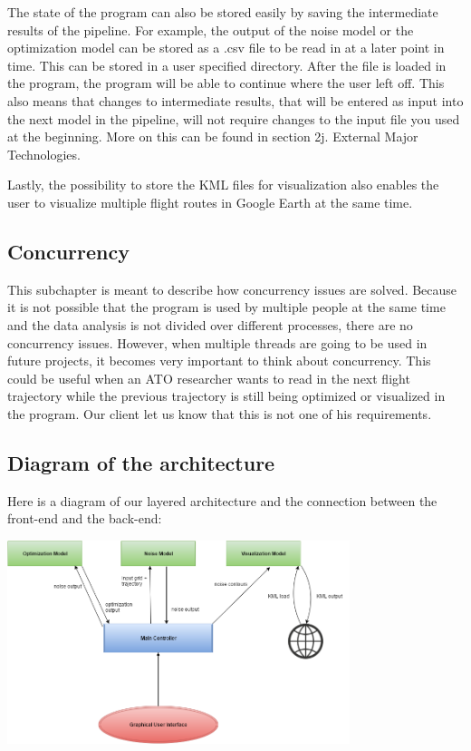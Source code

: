 The state of the program can also be stored easily by saving the intermediate results of the pipeline. For example, the output of the noise model or the optimization model can be stored as a .csv file to be read in at a later point in time. This can be stored in a user specified directory. After the file is loaded in the program, the program will be able to continue where the user left off. This also means that changes to intermediate results, that will be entered as input into the next model in the pipeline, will not require changes to the input file you used at the beginning. More on this can be found in section 2j. External Major Technologies.
 
Lastly, the possibility to store the KML files for visualization also enables the user to visualize multiple flight routes in Google Earth at the same time.

\subsection{Concurrency}
This subchapter is meant to describe how concurrency issues are solved. Because it is not possible that the program is used by multiple people at the same time and the data analysis is not divided over different processes, there are no concurrency issues. However, when multiple threads are going to be used in future projects, it becomes very important to think about concurrency. This could be useful when an ATO researcher wants to read in the next flight trajectory while the previous trajectory is still being optimized or visualized in the program. Our client let us know that this is not one of his requirements.

\newpage 

\subsection{Diagram of the architecture}

Here is a diagram of our layered architecture and the connection between the front-end and the back-end: \\

\begin{center}
\includegraphics[width= 0.75\textwidth]{images/EmergentArchitecture} \\
\end{center}

